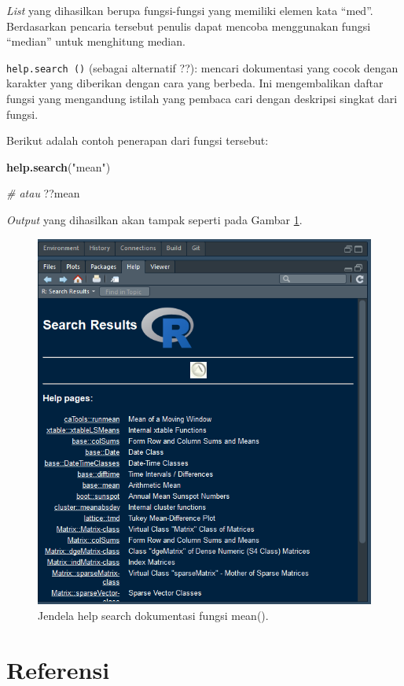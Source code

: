 \documentclass[]{book}
\newenvironment{Shaded}{\begin{snugshade}}{\end{snugshade}}
\newcommand{\KeywordTok}[1]{\textcolor[rgb]{0.13,0.29,0.53}{\textbf{#1}}}
\newcommand{\StringTok}[1]{\textcolor[rgb]{0.31,0.60,0.02}{#1}}
\newcommand{\CommentTok}[1]{\textcolor[rgb]{0.56,0.35,0.01}{\textit{#1}}}
\newcommand{\NormalTok}[1]{#1}
\begin{document}
\emph{List} yang dihasilkan berupa fungsi-fungsi yang memiliki elemen
kata ``med''. Berdasarkan pencaria tersebut penulis dapat mencoba
menggunakan fungsi ``median'' untuk menghitung median.

\texttt{help.search\ ()} (sebagai alternatif ??): mencari dokumentasi
yang cocok dengan karakter yang diberikan dengan cara yang berbeda. Ini
mengembalikan daftar fungsi yang mengandung istilah yang pembaca cari
dengan deskripsi singkat dari fungsi.

Berikut adalah contoh penerapan dari fungsi tersebut:

\begin{Shaded}
\begin{Highlighting}[]
\KeywordTok{help.search}\NormalTok{(}\StringTok{"mean"}\NormalTok{)}

\CommentTok{# atau}
\NormalTok{??mean}
\end{Highlighting}
\end{Shaded}

\emph{Output} yang dihasilkan akan tampak seperti pada Gambar
\ref{fig:helpsearch}.

\begin{figure}

{\centering \includegraphics[width=0.5\linewidth]{helpsearch} 

}

\caption{Jendela help search dokumentasi fungsi mean().}\label{fig:helpsearch}
\end{figure}

\section{Referensi}\label{referensi}
\end{document}
